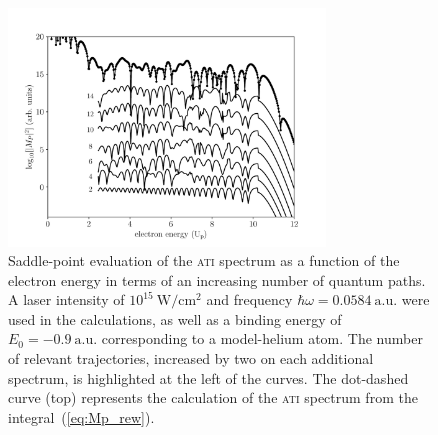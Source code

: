 \begin{figure}
  \centering \includegraphics[width =
    0.75\textwidth]{figures/ch_ATI_SPA/rescattering/14pathsvsqm.pdf}
  \caption{Saddle-point evaluation of the \textsc{ati} spectrum as a
    function of the electron energy in terms of an increasing number
    of quantum paths. A laser intensity of
    $10^{15}\ \mathrm{W/cm^{2}}$ and frequency $\hbar\omega =
    0.0584\ \mathrm{a.u.}$ were used in the calculations, as well as a
    binding energy of $E_{0} = -0.9\ \mathrm{a.u.}$ corresponding to a
    model-helium atom. The number of relevant trajectories, increased
    by two on each additional spectrum, is highlighted at the left of
    the curves. The dot-dashed curve (top) represents the calculation
    of the \textsc{ati} spectrum from the integral~(\ref{eq:Mp_rew}).}
  \label{fig:ati_spectrum}
\end{figure}








